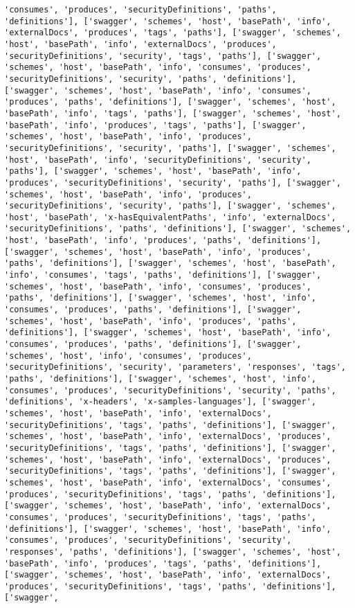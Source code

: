 \documentclass[11pt]{article}
\begin{document}
\begin{Verbatim}[commandchars=\\\{\}]
'consumes', 'produces', 'securityDefinitions', 'paths', 'definitions'], ['swagger', 'schemes', 'host', 'basePath', 'info', 'externalDocs', 'produces', 'tags', 'paths'], ['swagger', 'schemes', 'host', 'basePath', 'info', 'externalDocs', 'produces', 'securityDefinitions', 'security', 'tags', 'paths'], ['swagger', 'schemes', 'host', 'basePath', 'info', 'consumes', 'produces', 'securityDefinitions', 'security', 'paths', 'definitions'], ['swagger', 'schemes', 'host', 'basePath', 'info', 'consumes', 'produces', 'paths', 'definitions'], ['swagger', 'schemes', 'host', 'basePath', 'info', 'tags', 'paths'], ['swagger', 'schemes', 'host', 'basePath', 'info', 'produces', 'tags', 'paths'], ['swagger', 'schemes', 'host', 'basePath', 'info', 'produces', 'securityDefinitions', 'security', 'paths'], ['swagger', 'schemes', 'host', 'basePath', 'info', 'securityDefinitions', 'security', 'paths'], ['swagger', 'schemes', 'host', 'basePath', 'info', 'produces', 'securityDefinitions', 'security', 'paths'], ['swagger', 'schemes', 'host', 'basePath', 'info', 'produces', 'securityDefinitions', 'security', 'paths'], ['swagger', 'schemes', 'host', 'basePath', 'x-hasEquivalentPaths', 'info', 'externalDocs', 'securityDefinitions', 'paths', 'definitions'], ['swagger', 'schemes', 'host', 'basePath', 'info', 'produces', 'paths', 'definitions'], ['swagger', 'schemes', 'host', 'basePath', 'info', 'produces', 'paths', 'definitions'], ['swagger', 'schemes', 'host', 'basePath', 'info', 'consumes', 'tags', 'paths', 'definitions'], ['swagger', 'schemes', 'host', 'basePath', 'info', 'consumes', 'produces', 'paths', 'definitions'], ['swagger', 'schemes', 'host', 'info', 'consumes', 'produces', 'paths', 'definitions'], ['swagger', 'schemes', 'host', 'basePath', 'info', 'produces', 'paths', 'definitions'], ['swagger', 'schemes', 'host', 'basePath', 'info', 'consumes', 'produces', 'paths', 'definitions'], ['swagger', 'schemes', 'host', 'info', 'consumes', 'produces', 'securityDefinitions', 'security', 'parameters', 'responses', 'tags', 'paths', 'definitions'], ['swagger', 'schemes', 'host', 'info', 'consumes', 'produces', 'securityDefinitions', 'security', 'paths', 'definitions', 'x-headers', 'x-samples-languages'], ['swagger', 'schemes', 'host', 'basePath', 'info', 'externalDocs', 'securityDefinitions', 'tags', 'paths', 'definitions'], ['swagger', 'schemes', 'host', 'basePath', 'info', 'externalDocs', 'produces', 'securityDefinitions', 'tags', 'paths', 'definitions'], ['swagger', 'schemes', 'host', 'basePath', 'info', 'externalDocs', 'produces', 'securityDefinitions', 'tags', 'paths', 'definitions'], ['swagger', 'schemes', 'host', 'basePath', 'info', 'externalDocs', 'consumes', 'produces', 'securityDefinitions', 'tags', 'paths', 'definitions'], ['swagger', 'schemes', 'host', 'basePath', 'info', 'externalDocs', 'consumes', 'produces', 'securityDefinitions', 'tags', 'paths', 'definitions'], ['swagger', 'schemes', 'host', 'basePath', 'info', 'consumes', 'produces', 'securityDefinitions', 'security', 'responses', 'paths', 'definitions'], ['swagger', 'schemes', 'host', 'basePath', 'info', 'produces', 'tags', 'paths', 'definitions'], ['swagger', 'schemes', 'host', 'basePath', 'info', 'externalDocs', 'produces', 'securityDefinitions', 'tags', 'paths', 'definitions'], ['swagger', 
\end{Verbatim}
\end{document}
